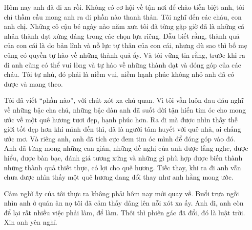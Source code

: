 Hôm nay anh đã đi xa rồi. Không có cơ hội về tận nơi để chào tiễn biệt anh, tôi chỉ thầm cầu mong anh ra đi phần nào thanh thản. Tôi nghĩ đến các cháu, con anh chị. Những cô cậu bé ngày nào năm xưa tôi đã từng gặp giờ đã là những cá nhân thành đạt xứng đáng trong các chọn lựa riêng. Dẫu biết rằng, thành quả của con cái là do bản lĩnh và nỗ lực tự thân của con cái, nhưng dù sao thì bố mẹ cũng có quyền tự hào về những thành quả ấy. Và tôi vững tin rằng, trước khi ra đi anh cũng có thể vui lòng và tự hào về những thành đạt và đóng góp của các cháu. Tôi tự nhủ, đó phải là niềm vui, niềm hạnh phúc không nhỏ anh đã có được và mang theo.

Tôi đã viết “phần nào”, với chút xót xa chủ quan. Vì tôi vẫn luôn đau đáu nghĩ về những bậc cha chú, những bậc đàn anh đã suốt đời tận hiến tim óc cho mong ước về một quê hương tươi đẹp, hạnh phúc hơn. Ra đi mà được nhìn thấy thế giới tốt đẹp hơn khi mình đến thì, đã là người tâm huyết với quê nhà, ai chẳng ước mơ. Và riêng anh, anh đã tích cực đem tim óc mình để đóng góp vào đó. Anh đã từng mong những can gián, những đề nghị của anh được lắng nghe, được hiểu, được bàn bạc, đánh giá tương xứng và những gì phù hợp được biến thành những thành quả thiết thực, có lợi cho quê hương. Tiếc thay, khi ra đi anh vẫn chưa được nhìn thấy một quê hương đang đổi thay như anh hằng mong ước.


Cảm nghĩ ấy của tôi thực ra không phải hôm nay mới quay về. Buổi trưa ngồi nhìn anh ở quán ăn nọ tôi đã cảm thấy dâng lên nỗi xót xa ấy. Anh đi, anh còn để lại rất nhiều việc phải làm, để làm. Thôi thì phiên gác đã đổi, đó là luật trời. Xin anh yên nghỉ.

